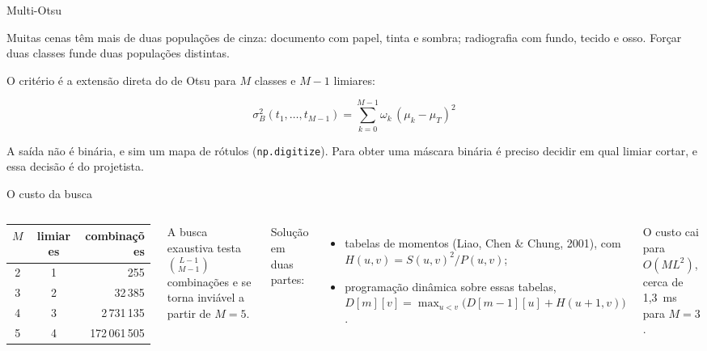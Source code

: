\documentclass[aspectratio=169,12pt]{beamer}
\begin{document}
\begin{frame}{Multi-Otsu}

  Muitas cenas têm mais de duas populações de cinza: documento com papel, tinta
  e sombra; radiografia com fundo, tecido e osso. Forçar duas classes funde duas
  populações distintas.

  \vspace{.4em}
  O critério é a extensão direta do de Otsu para $M$ classes e $M-1$ limiares:

  \[
    \sigma_B^2(t_1,\dots,t_{M-1}) = \sum_{k=0}^{M-1}\omega_k\,(\mu_k-\mu_T)^2
  \]

  \vspace{-.2em}
  A saída não é binária, e sim um mapa de rótulos (\texttt{np.digitize}).
  Para obter uma máscara binária é preciso decidir em qual limiar cortar, e essa
  decisão é do projetista.

\end{frame}

\begin{frame}{O custo da busca}

  \begin{columns}[c,onlytextwidth]
      \footnotesize
      \begin{tabular}{@{}ccr@{}}
        \toprule
        $M$ & limiares & combinações \\
        \midrule
        2 & 1 & 255 \\
        3 & 2 & 32\,385 \\
        4 & 3 & 2\,731\,135 \\
        5 & 4 & 172\,061\,505 \\
        \bottomrule
      \end{tabular}

      \vspace{.8em}
      \normalsize
      A busca exaustiva testa $\binom{L-1}{M-1}$ combinações e se torna
      inviável a partir de $M=5$.

      Solução em duas partes:

      \begin{itemize}
        \item tabelas de momentos (Liao, Chen \& Chung, 2001), com
          $H(u,v) = S(u,v)^2/P(u,v)$;
        \item programação dinâmica sobre essas tabelas,
          $D[m][v]=\max_{u<v}\bigl(D[m{-}1][u]+H(u{+}1,v)\bigr)$.
      \end{itemize}

      \vspace{.4em}
      O custo cai para $O(M L^2)$, cerca de 1,3~ms para $M=3$.
  \end{columns}

\end{frame}
\end{document}
